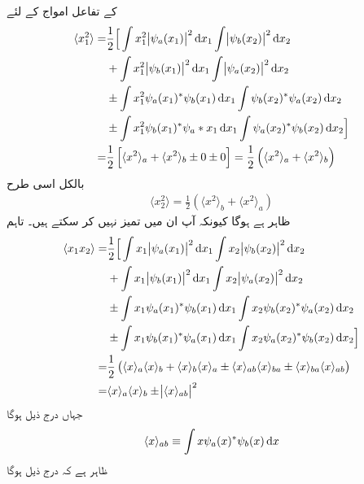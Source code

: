   کے تفاعل امواج کے لئے 
\begin{gather*}
	\begin{aligned}
		\langle x_1^2 \rangle =& \frac{1}{2}\Big[\int x_1^2\abs{\psi_a(x_1)}^2\dif x_1\int\abs{\psi_b(x_2)}^2\dif x_2 \\
		&+ \int x_1^2\abs{\psi_b(x_1)}^2\dif x_1\int\abs{\psi_a(x_2)}^2\dif x_2 \\
		&\pm\int x_1^2\psi_a(x_1)^*\psi_b(x_1)\dif x_1\int\psi_b(x_2)^*\psi_a(x_2)\dif x_2 \\
		&\pm\int x_1^2\psi_b(x_1)^*\psi_a*x_1\dif x_1\int\psi_a(x_2)^*\psi_b(x_2)\dif x_2\Big] \\
		=& \frac{1}{2}\left[\langle x^2 \rangle_a+\langle x^2 \rangle_b\pm0\pm0\right]=\frac{1}{2}\left(\langle x^2 \rangle_a+\langle x^2\rangle_b\right)
	\end{aligned}
\end{gather*}
بالکل اسی طرح
\begin{align*}
	\langle x_2^2 \rangle=\frac{1}{2}\left(\langle x^2 \rangle_b+\langle x^2 \rangle_a\right)
\end{align*}
ظاہر ہے  ہوگا کیونکہ آپ ان میں تمیز نہیں کر سکتے ہیں۔ تاہم
\begin{gather*}
	\begin{aligned}
		\langle x_1x_2 \rangle=&\frac{1}{2}\Big[\int x_1\abs{\psi_a(x_1)}^2\dif x_1\int x_2\abs{\psi_b(x_2)}^2\dif x_2 \\
		&+\int x_1\abs{\psi_b(x_1)}^2\dif x_1\int x_2\abs{\psi_a(x_2)}^2\dif x_2 \\
		&\pm\int x_1\psi_a(x_1)^*\psi_b(x_1)\dif x_1\int x_2\psi_b(x_2)^*\psi_a(x_2)\dif x_2 \\
		&\pm\int x_1\psi_b(x_1)^*\psi_a(x_1)\dif x_1\int x_2\psi_a(x_2)^*\psi_b(x_2)\dif x_2\Big] \\
		=& \frac{1}{2}\left(\langle x \rangle_a\langle x \rangle_b+\langle x \rangle_b\langle x \rangle_a\pm\langle x \rangle_{ab}\langle x \rangle_{ba}\pm\langle x \rangle_{ba}\langle x \rangle_{ab}\right)\\
		=&\langle x \rangle_a\langle x \rangle_b\pm\abs{\langle x \rangle_{ab}}^2
	\end{aligned}
\end{gather*}
جہاں درج ذیل ہوگا
\begin{align}
	\langle x \rangle_{ab}\equiv\int x\psi_a(x)^*\psi_b(x)\dif x
\end{align}
ظاہر ہے کہ درج ذیل ہوگا
